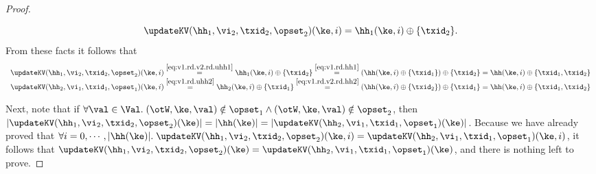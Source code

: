\begin{proof}
\begin{enumerate}
\begin{enumerate}
\begin{equation}
\updateKV(\hh_1, \vi_2, \txid_2, \opset_2)(\ke, i) = \hh_1(\ke, i) \oplus \{ \txid_2\}.
\label{eq:v1.rd.v2.rd.uhh1}
\end{equation}
From these facts it follows that
\[
\begin{array}{l}
\updateKV(\hh_1, \vi_2, \txid_2, \opset_2)(\ke, i) \stackrel{\eqref{eq:v1.rd.v2.rd.uhh1}}{=} \hh_1(\ke, i) \oplus \{\txid_2\} \stackrel{\eqref{eq:v1.rd.hh1}}{=} 
(\hh(\ke, i) \oplus \{\txid_1\}) \oplus \{\txid_2 \} = \hh(\ke, i) \oplus \{\txid_1, \txid_2\}\\
\updateKV(\hh_2, \vi_1, \txid_1, \opset_1)(\ke, i) \stackrel{\eqref{eq:v1.rd.uhh2}}{=} \hh_2(\ke, i) \oplus \{\txid_1\} 
\stackrel{\eqref{eq:v1.rd.v2.rd.hh2}}{=} (\hh(\ke, i) \oplus \{\txid_2\}) \oplus \{\txid_1\} = \hh(\ke, i) \oplus \{\txid_1, \txid_2\}
\end{array}
\]
\end{enumerate}
\end{enumerate}

Next, note that if $\forall \val \in \Val.\;(\otW,\ke,\val) \notin \opset_1 \wedge (\otW, \ke, \val) \notin 
\opset_2$, then $\lvert \updateKV(\hh_1, \vi_2, \txid_2, \opset_2)(\ke) \rvert = \lvert \hh(\ke) \rvert 
= \lvert \updateKV(\hh_2, \vi_1, \txid_1, \opset_1)(\ke) \rvert$. 
Because we have already proved that $\forall i = 0,\cdots, \lvert \hh(\ke) \rvert.\; \updateKV(\hh_1, 
\vi_2, \txid_2, \opset_2)(\ke, i) = \updateKV(\hh_2, \vi_1, \txid_1, \opset_1)(\ke, i)$, it follows 
that $\updateKV(\hh_1, \vi_2, \txid_2, \opset_2)(\ke) = \updateKV(\hh_2,\vi_1,\txid_1,\opset_1)(\ke)$, 
and there is nothing left to prove.


\end{proof}
